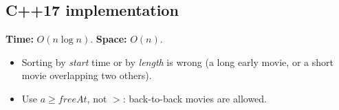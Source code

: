 \subsection*{C++17 implementation}

\begin{complexitybox}
\textbf{Time:} $O(n\log n)$. \textbf{Space:} $O(n)$.
\end{complexitybox}

\begin{pitfallbox}
\begin{itemize}
  \item Sorting by \emph{start} time or by \emph{length} is wrong
        (a long early movie, or a short movie overlapping two others).
  \item Use $a\ge freeAt$, not $>$: back-to-back movies are allowed.
\end{itemize}
\end{pitfallbox}
